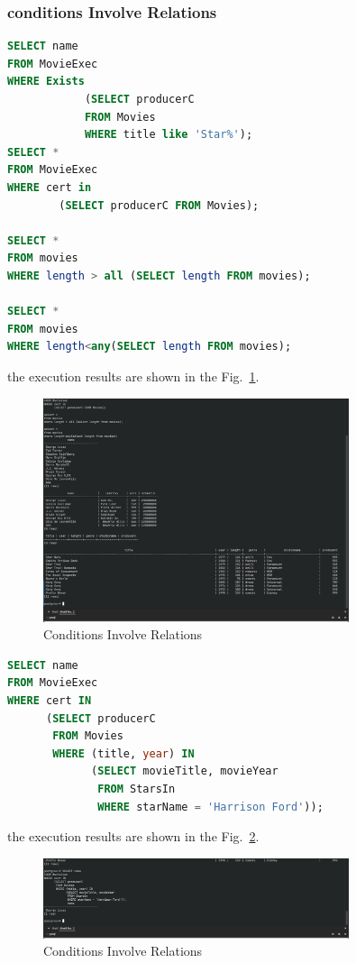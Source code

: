 \documentclass{cshwk}
\begin{document}
\subsubsection{conditions Involve Relations}

\begin{lstlisting}[language=sql]
SELECT name
FROM MovieExec
WHERE Exists
            (SELECT producerC
            FROM Movies
            WHERE title like 'Star%');
SELECT *
FROM MovieExec
WHERE cert in
        (SELECT producerC FROM Movies);

SELECT *
FROM movies
WHERE length > all (SELECT length FROM movies);

SELECT *
FROM movies
WHERE length<any(SELECT length FROM movies);
\end{lstlisting}

the execution results are shown in the Fig.~\ref{fig:conditions-involve-relations-1}.

\begin{figure}[H]
    \centering
    \includegraphics[width=0.8\textwidth]{hw5-7.png}
    \caption{Conditions Involve Relations}
    \label{fig:conditions-involve-relations-1}
\end{figure}

\begin{lstlisting}[language=sql]
SELECT name
FROM MovieExec
WHERE cert IN
      (SELECT producerC
       FROM Movies
       WHERE (title, year) IN
             (SELECT movieTitle, movieYear
              FROM StarsIn
              WHERE starName = 'Harrison Ford'));
\end{lstlisting}

the execution results are shown in the Fig.~\ref{fig:conditions-involve-relations-2}.

\begin{figure}[H]
    \centering
    \includegraphics[width=0.8\textwidth]{hw5-8.png}
    \caption{Conditions Involve Relations}
    \label{fig:conditions-involve-relations-2}
\end{figure}
\end{document}
